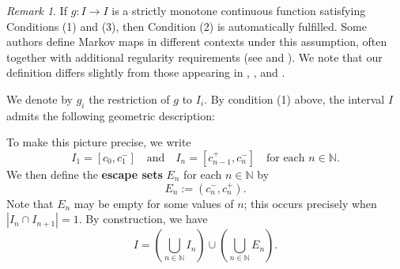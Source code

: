 \documentclass[12pt, reqno]{amsart}
\theoremstyle{definition}
\theoremstyle{remark}
\newtheorem{remark}[theorem]{Remark}
\numberwithin{equation}{section}
\begin{document}
\begin{remark}
    If $g: I \to I$ is a strictly monotone continuous function satisfying Conditions (1) and (3), 
    then Condition (2) is automatically fulfilled. 
    Some authors define Markov maps in different contexts under this assumption, 
    often together with additional regularity requirements (see \cite{OutroMarkov} and \cite{Rufus}). 
    We note that our definition differs slightly from those appearing in 
    \cite{CMP}, \cite{RMP5}, and \cite{RMP10}.
\end{remark}







We denote by $g_i$ the restriction of $g$ to $I_i$. 
By condition (1) above, the interval $I$ admits the following geometric description:


\begin{center}
\end{center}



To make this picture precise, we write 
\[
I_1 = [c_0, c_1^{-}] 
\quad \text{and} \quad 
I_n = [c_{n-1}^{+}, c_{n}^{-}] \quad \text{for each } n \in \mathbb{N}.
\]
We then define the \textbf{escape sets} $E_n$ for each $n \in \mathbb{N}$ by
\[
E_n := (c_{n}^{-}, c_{n}^{+}).
\]
Note that $E_n$ may be empty for some values of $n$; this occurs precisely when 
$|I_n \cap I_{n+1}| = 1$. 
By construction, we have
\[
I = \left( \bigcup_{n \in \mathbb{N}} I_n \right) \cup \left( \bigcup_{n \in \mathbb{N}} E_n \right).
\]
\end{document}
